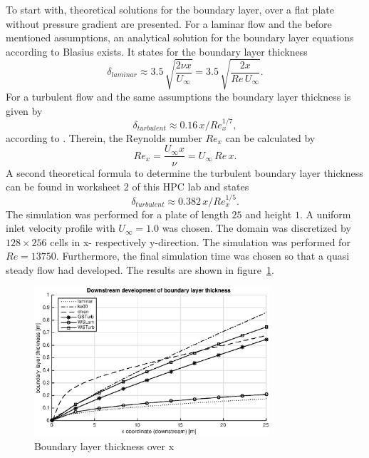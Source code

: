 \noii To start with, theoretical solutions for the boundary layer, over a flat plate without pressure gradient are presented. For a laminar flow and the before mentioned assumptions, an analytical solution for the boundary layer equations according to Blasius exists. It states for the boundary layer thickness
\begin{equation}
	\delta_{laminar} \approx 3.5\,\sqrt{\frac{2\nu x}{U_\infty}} = 3.5\,\sqrt{\frac{2x}{Re\,U_\infty}}.
\end{equation}
For a turbulent flow and the same assumptions the boundary layer thickness is given by
\begin{equation}
	\delta_{turbulent} \approx 0.16\,x / Re_x^{1/7},
\end{equation}
according to \citep{stemmer2015}.
Therein, the Reynolds number $Re_x$ can be calculated by
\begin{equation}
	Re_x = \frac{U_\infty x}{\nu} = U_\infty\,Re\,x.
\end{equation}
A second theoretical formula to determine the turbulent boundary layer thickness can be found in worksheet 2 of this HPC lab and states
\begin{equation}
	\delta_{turbulent} \approx 0.382\,x/Re_x^{1/5}.
\end{equation}
The simulation was performed for a plate of length $25$ and height $1$. A uniform inlet velocity profile with $U_\infty = 1.0$ was chosen. The domain was discretized by $128\times256$ cells in x- respectively y-direction. The simulation was performed for $Re=13750$. 
Furthermore, the final simulation time was chosen so that a quasi steady flow had developed. The results are shown in figure~\ref{fig:boundarylayerthickness}.

\begin{figure}[!htb]
\centering
\includegraphics[width=0.78\textwidth]{FIGURES/blThickness.eps}
\caption{Boundary layer thickness over x}
\label{fig:boundarylayerthickness}
\end{figure} 


